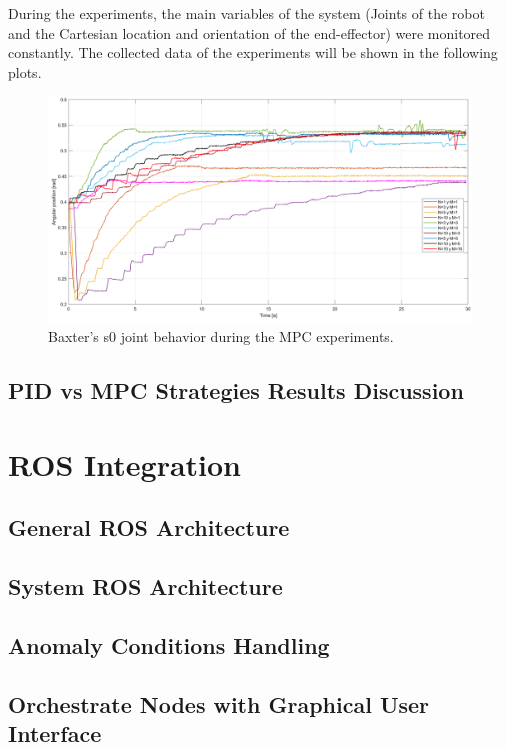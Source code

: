 \documentclass[11pt]{report} %
\begin{document}
During the experiments, the main variables of the system (Joints of the robot and the Cartesian location and orientation of the end-effector) were monitored constantly. The collected data of the experiments will be shown in the following plots.\\

\begin{figure}[H]
    \centering
    \includegraphics[width=0.5\linewidth]{assets/imgs/control_theory/mpc_tests/s0.png}
    \caption{Baxter's s0 joint behavior during the MPC experiments.} 
    \label{fig_baxter_s0_mpc_experiments}
\end{figure}



\section{PID vs MPC Strategies Results Discussion}

\chapter{ROS Integration}

\section{General ROS Architecture}

\section{System ROS Architecture}

\section{Anomaly Conditions Handling}

\section{Orchestrate Nodes with Graphical User Interface}
\end{document}
